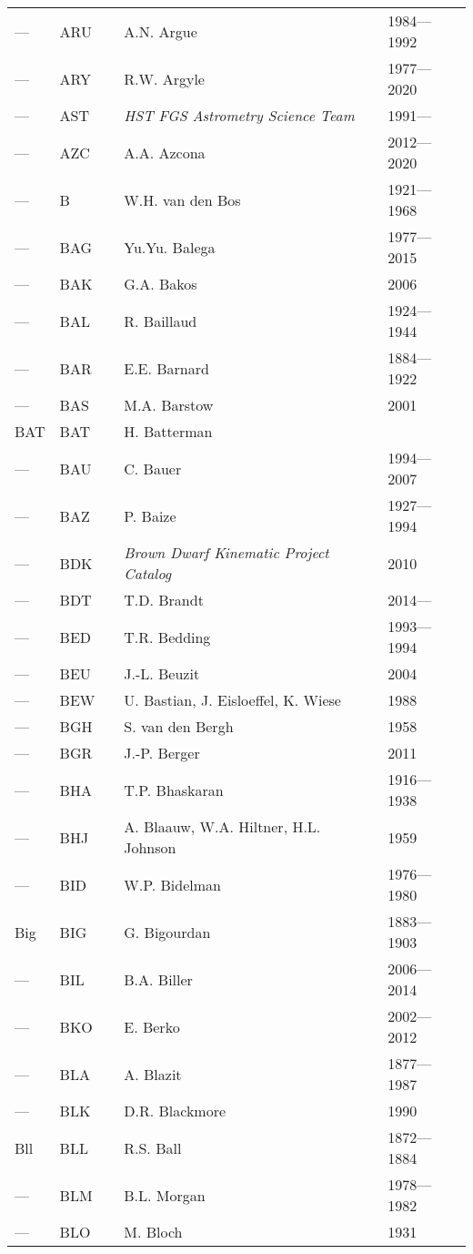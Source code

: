 \begin{longtable}{l|l|c|p{59mm}|l}
--- & ARU &   & A.N. Argue & 1984---1992 \\
--- & ARY &   & R.W. Argyle & 1977---2020 \\
--- & AST &   & \emph{HST FGS Astrometry Science Team} & 1991--- \\
--- & AZC &   & A.A. Azcona & 2012---2020 \\\midrule
---	& B   &   & W.H. van den Bos & 1921---1968 \\
--- & BAG &   & Yu.Yu. Balega & 1977---2015 \\
--- & BAK &   & G.A. Bakos & 2006 \\
--- & BAL &   & R. Baillaud & 1924---1944 \\
--- & BAR &   & E.E. Barnard & 1884---1922 \\
--- & BAS &   & M.A. Barstow & 2001 \\
BAT & BAT &   & H. Batterman & \\
--- & BAU &   & C. Bauer & 1994---2007 \\
--- & BAZ &   & P. Baize & 1927---1994 \\
--- & BDK &   & \emph{Brown Dwarf Kinematic Project Catalog} & 2010 \\
--- & BDT &   & T.D. Brandt & 2014--- \\
--- & BED &   & T.R. Bedding & 1993---1994 \\
--- & BEU &   & J.-L. Beuzit & 2004 \\
--- & BEW &   & U. Bastian, J. Eisloeffel, K. Wiese & 1988 \\
--- & BGH &   & S. van den Bergh & 1958 \\
--- & BGR &   & J.-P. Berger & 2011 \\
--- & BHA &   & T.P. Bhaskaran & 1916---1938 \\
--- & BHJ &   & A. Blaauw, W.A. Hiltner, H.L. Johnson & 1959 \\
--- & BID &   & W.P. Bidelman & 1976---1980 \\
Big & BIG &   & G. Bigourdan & 1883---1903 \\
--- & BIL &   & B.A. Biller & 2006---2014 \\
--- & BKO &   & E. Berko & 2002---2012 \\
--- & BLA &   & A. Blazit & 1877---1987 \\
--- & BLK &   & D.R. Blackmore & 1990 \\
Bll & BLL &   & R.S. Ball & 1872---1884 \\
--- & BLM &   & B.L. Morgan & 1978---1982 \\
--- & BLO &   & M. Bloch & 1931 \\

\end{longtable}
